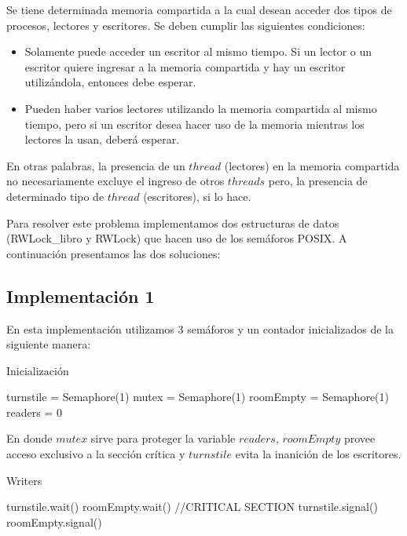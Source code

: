 Se tiene determinada memoria compartida a la cual desean acceder dos tipos de procesos, lectores y escritores. Se deben cumplir las siguientes condiciones:
\begin{itemize}
	\item Solamente puede acceder un escritor al mismo tiempo. Si un lector o un escritor quiere ingresar a la memoria compartida y hay un escritor utilizándola, entonces debe esperar.
	\item Pueden haber varios lectores utilizando la memoria compartida al mismo tiempo, pero si un escritor desea hacer uso de la memoria mientras los lectores la usan, deberá esperar.
\end{itemize}

En otras palabras, la presencia de un $thread$ (lectores) en la memoria compartida no necesariamente excluye el ingreso de otros $threads$ pero, la presencia de determinado tipo de $thread$ (escritores), si lo hace.

Para resolver este problema implementamos dos estructuras de datos (RWLock\_libro y RWLock) que hacen uso de los semáforos POSIX. A continuación presentamos las dos soluciones:

\subsection{Implementación 1} 

En esta implementación utilizamos 3 semáforos y un contador inicializados de la siguiente manera:

\begin{algorithm}[H]
\caption{Inicialización}\label{ej1}
\begin{algorithmic}[1]
	\State turnstile = Semaphore(1)
	\State mutex = Semaphore(1)
	\State roomEmpty = Semaphore(1)
	\State readers = 0
\EndProcedure
\end{algorithmic}
\end{algorithm}

En donde $mutex$ sirve para proteger la variable $readers$, $roomEmpty$ provee acceso exclusivo a la sección crítica y $turnstile$ evita la inanición de los escritores.

\begin{algorithm}[H]
\caption{Writers}\label{ej1}
\begin{algorithmic}[1]
	\State turnstile.wait()
	\State roomEmpty.wait()
	\State //CRITICAL SECTION
	\State turnstile.signal()
	\State roomEmpty.signal()
\EndProcedure
\end{algorithmic}
\end{algorithm}

